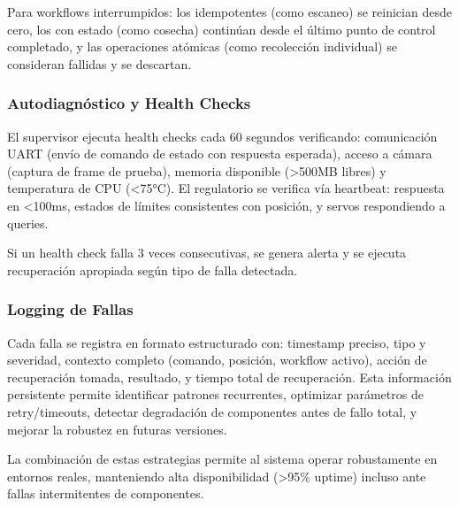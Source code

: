 Para workflows interrumpidos: los idempotentes (como escaneo) se reinician desde cero, los con estado (como cosecha) continúan desde el último punto de control completado, y las operaciones atómicas (como recolección individual) se consideran fallidas y se descartan.

\subsubsection{Autodiagnóstico y Health Checks}

El supervisor ejecuta health checks cada 60 segundos verificando: comunicación UART (envío de comando de estado con respuesta esperada), acceso a cámara (captura de frame de prueba), memoria disponible (>500MB libres) y temperatura de CPU (<75°C). El regulatorio se verifica vía heartbeat: respuesta en <100ms, estados de límites consistentes con posición, y servos respondiendo a queries.

Si un health check falla 3 veces consecutivas, se genera alerta y se ejecuta recuperación apropiada según tipo de falla detectada.

\subsubsection{Logging de Fallas}

Cada falla se registra en formato estructurado con: timestamp preciso, tipo y severidad, contexto completo (comando, posición, workflow activo), acción de recuperación tomada, resultado, y tiempo total de recuperación. Esta información persistente permite identificar patrones recurrentes, optimizar parámetros de retry/timeouts, detectar degradación de componentes antes de fallo total, y mejorar la robustez en futuras versiones.

La combinación de estas estrategias permite al sistema operar robustamente en entornos reales, manteniendo alta disponibilidad (>95\% uptime) incluso ante fallas intermitentes de componentes.
